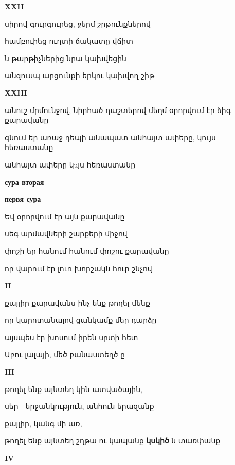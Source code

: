 \centerline {\bf XXII}
 

սիրով գուրգուրեց, ջերմ շրթունքներով



համբուիեց ուղտի ճակատը վճիտ


ն թարթիչներից նրա կախվեցին



անզուսպ արցունքի երկու կախվող շիթ


\centerline {\bf XXIII}



 անուշ մրմունջով, նիրհած դաշտերով մեղմ օրորվում էր ձիգ քարավանը


 գնում  եր  առաջ դեպի անապատ անհայտ ափերը, կույս հեռաստանը


 անհայտ ափերը կuյս հեռաստանը

   
\centerline {\bf сура вторая }





\centerline {\bf первя сура}

Եվ օրորվում էր այն քարավանը


սեգ արմավների շարքերի միջով 

փոշի եր հանում հանում փոշու քարավանը


որ վարում էր լուռ խորշակն հուր շնչով



\centerline{\bf II}


քայլիր քարավանս  ինչ  ենք թողել մենք 


որ կարոտանալով ցանկամք մեր դարձը


այսպես էր խոսում իրեն սրտի հետ


Աբու  լալայի, մեծ բանաստեղծ                                                                                                                                                                                                                                                                                                                                                                                                                                          ը


\centerline{\bf  III}

թողել ենք այնտեղ կին ատվածային, 


սեր - երջանկություն,  անհուն երազանք


քայլիր, կանգ մի առ,


թողել ենք այնտեղ շղթա ու  կապանք {\bf կսկիծ} ն  տառփանք


\centerline  {\bf IV  }


